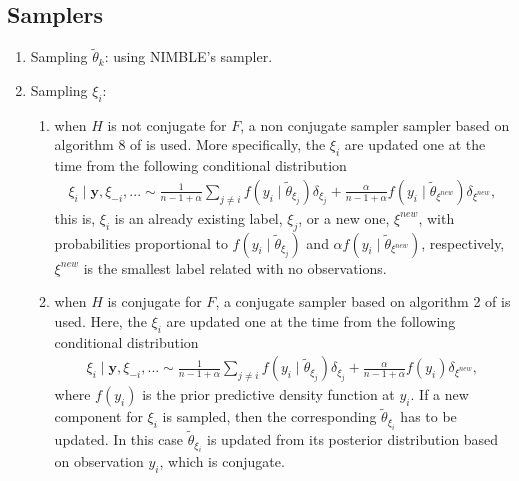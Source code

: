 \documentclass[12pt]{article}
\begin{document}
\subsection{Samplers}
\begin{enumerate}
\item Sampling $\tilde{\theta}_k$: using NIMBLE's sampler.
\item Sampling $\xi_i$:
\begin{enumerate}
\item when $H$ is not conjugate for $F$, a non conjugate sampler sampler based on algorithm 8 of \cite{neal;2000} is used.  More specifically, the $\xi_i$ are updated one at the time  from the following conditional distribution
\begin{align*}
\xi_i\mid \boldsymbol{y}, \xi_{-i},... \sim \frac{1}{n-1+\alpha}\sum_{j \neq i}f(y_i\mid \tilde{\theta}_{\xi_j})\delta_{\xi_j} +\frac{\alpha}{n-1+\alpha}f(y_i\mid \tilde{\theta}_{\xi^{new}})\delta_{\xi^{new}},
\end{align*}
this is, $\xi_i$ is an already existing label, $\xi_j$,  or a new one, $\xi^{new}$, with probabilities proportional to $f(y_i\mid \tilde{\theta}_{\xi_j})$ and $\alpha f(y_i\mid \tilde{\theta}_{\xi^{new}})$, respectively,   $\xi^{new}$ is the smallest label related with no observations. 
\item when $H$ is conjugate for $F$, a conjugate sampler based on algorithm 2  of \cite{neal;2000} is used. Here, the  $\xi_i$  are updated one at the time from the following conditional distribution
\begin{align*}
\xi_i\mid \boldsymbol{y}, \xi_{-i},... \sim \frac{1}{n-1+\alpha}\sum_{j \neq i}f(y_i\mid \tilde{\theta}_{\xi_j})\delta_{\xi_j} +\frac{\alpha}{n-1+\alpha}f(y_i)\delta_{\xi^{new}},
\end{align*}
where $f(y_i)$ is the prior predictive density function at $y_i$.  If a new component for $\xi_i$ is sampled, then the corresponding $\tilde{\theta}_{\xi_i}$ has to be updated. In this case $\tilde{\theta}_{\xi_i}$ is updated from its posterior distribution  based on observation $y_i$, which is conjugate.\\


\end{enumerate}
\end{enumerate}
\end{document}
